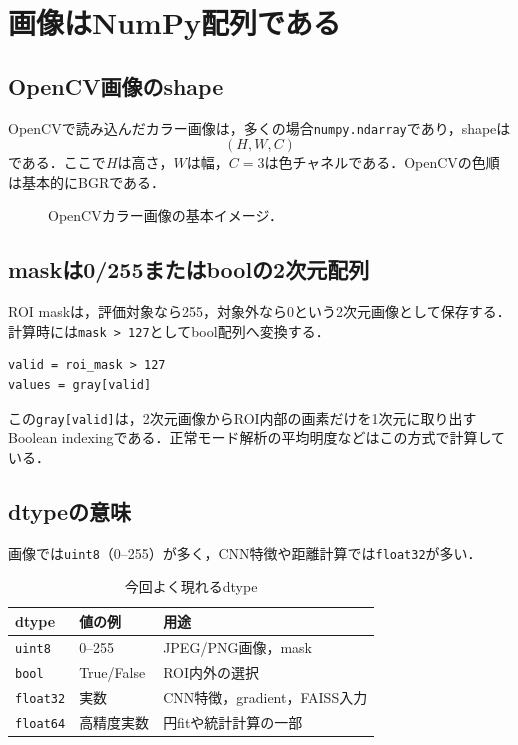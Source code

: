 \documentclass[a4paper,11pt]{ltjsreport}
\begin{document}
\chapter{画像はNumPy配列である}

\section{OpenCV画像のshape}
OpenCVで読み込んだカラー画像は，多くの場合\texttt{numpy.ndarray}であり，shapeは
\[
(H, W, C)
\]
である．ここで\(H\)は高さ，\(W\)は幅，\(C=3\)は色チャネルである．OpenCVの色順は基本的にBGRである．

\begin{figure}[H]
\centering
{}
\caption{OpenCVカラー画像の基本イメージ．}
\end{figure}

\section{maskは0/255またはboolの2次元配列}
ROI maskは，評価対象なら255，対象外なら0という2次元画像として保存する．計算時には\texttt{mask > 127}としてbool配列へ変換する．

\begin{lstlisting}
valid = roi_mask > 127
values = gray[valid]
\end{lstlisting}

この\texttt{gray[valid]}は，2次元画像からROI内部の画素だけを1次元に取り出すBoolean indexingである．正常モード解析の平均明度などはこの方式で計算している．

\section{dtypeの意味}
画像では\texttt{uint8}（0--255）が多く，CNN特徴や距離計算では\texttt{float32}が多い．

\begin{table}[H]
\centering
\caption{今回よく現れるdtype}
\begin{tabularx}{\linewidth}{L{30mm} L{35mm} Y}
\toprule
dtype & 値の例 & 用途 \\
\midrule
\texttt{uint8} & 0--255 & JPEG/PNG画像，mask \\
\texttt{bool} & True/False & ROI内外の選択 \\
\texttt{float32} & 実数 & CNN特徴，gradient，FAISS入力 \\
\texttt{float64} & 高精度実数 & 円fitや統計計算の一部 \\
\bottomrule
\end{tabularx}
\end{table}
\end{document}
